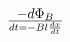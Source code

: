 \documentclass[preview]{standalone}
\begin{document}
\begin{align*}
- d\Phi_B}\over{dt  =  - B l  {{dx} \over {dt}}
\end{align*}
\end{document}
